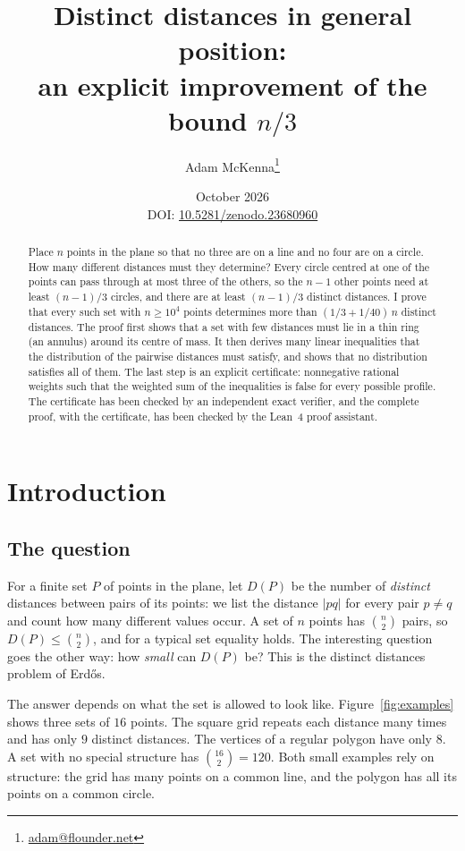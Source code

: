 \documentclass[11pt]{article}
\title{Distinct distances in general position:\\
       an explicit improvement of the bound $n/3$}
\author{Adam McKenna\thanks{\href{mailto:adam@flounder.net}{adam@flounder.net}}}
\date{October 2026\\[4pt]
      \small DOI: \href{https://doi.org/10.5281/zenodo.23680960}{10.5281/zenodo.23680960}}
\theoremstyle{remark}
\begin{document}
\maketitle

\begin{abstract}
Place $n$ points in the plane so that no three are on a line and no four
are on a circle. How many different distances must they determine? Every
circle centred at one of the points can pass through at most three of the
others, so the $n-1$ other points need at least $(n-1)/3$ circles, and
there are at least $(n-1)/3$ distinct distances. I prove that every such set with $n \ge 10^4$ points
determines more than $(1/3 + 1/40)\,n$ distinct distances. The proof first
shows that a set with few distances must lie in a thin ring (an annulus)
around its centre of mass. It then derives many linear inequalities that
the distribution of the pairwise distances must satisfy, and shows that no
distribution satisfies all of them. The last step is an explicit
certificate: nonnegative rational weights such that the weighted sum of the inequalities is false for every possible profile. The certificate has been
checked by an independent exact verifier, and the complete proof, with the
certificate, has been checked by the Lean~4 proof assistant.
\end{abstract}

\section{Introduction}

\subsection{The question}

For a finite set $P$ of points in the plane, let $D(P)$ be the number of
\emph{distinct} distances between pairs of its points: we list the distance
$|pq|$ for every pair $p \ne q$ and count how many different values occur.
A set of $n$ points has $\binom n2$ pairs, so $D(P) \le \binom n2$, and
for a typical set equality holds. The interesting question goes the other
way: how \emph{small} can $D(P)$ be? This is the distinct distances problem
of Erd\H{o}s.

The answer depends on what the set is allowed to look like.
Figure~\ref{fig:examples} shows three sets of $16$ points. The square grid
repeats each distance many times and has only $9$ distinct distances. The
vertices of a regular polygon have only $8$. A set with no special
structure has $\binom{16}{2} = 120$. Both small examples rely on structure:
the grid has many points on a common line, and the polygon has all its
points on a common circle.
\end{document}
